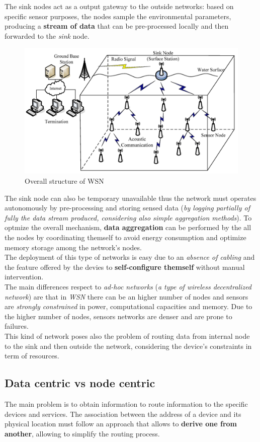 \documentclass[10pt,a4paper]{report}
\theoremstyle{definition}
\begin{document}
The sink nodes act as a output gateway to the outside networks: based on specific sensor purposes, the nodes sample the environmental parameters, producing a \textbf{stream of data} that can be pre-processed locally and then forwarded to the \textit{sink} node.
\begin{figure}[h]
	\centering\includegraphics[scale=0.13]{images/Pasted image 20230522162020.png}
	\caption{Overall structure of WSN}
\end{figure}

The sink node can also be temporary unavailable thus the network must operates autonomously by pre-processing and storing sensed data (\textit{by logging partially of fully the data stream produced, considering also simple aggregation methods}).
To optmize the overall mechanism, \textbf{data aggregation} can be performed by the all the nodes by coordinating themself to avoid energy consumption and optimize memory storage among the network's nodes.\\
The deployment of this type of networks is easy due to an \textit{absence of cabling} and the feature offered by the devies to \textbf{self-configure themself} without manual intervention.\\
The main differences respect to \textit{ad-hoc networks} (\textit{a type of wireless decentralized network}) are that in \textit{WSN} there can be an higher number of nodes and sensors are \textit{strongly constrained} in power, computational capacities and memory.  Due to the higher number of nodes, sensors networks are denser and are prone to failures.\\
This kind of network poses also the problem of routing data from internal node to the sink and then outside the network, considering the device's constraints in term of resources.
\subsection{Data centric vs node centric}\label{sec:data-centric-vs-node-centric}
The main problem is to obtain information to route information to the specific devices and services.
The association between the address of a device and its physical location must follow an approach that allows to \textbf{derive one from another}, allowing to simplify the routing process.
\end{document}
